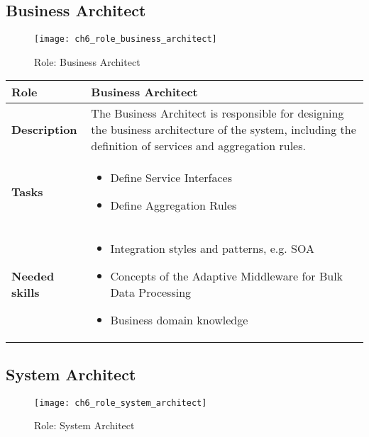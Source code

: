 \subsection{Business Architect}

\begin{figure}[htpb] \centering 
	\texttt{[image: ch6\_role\_business\_architect]} 
	\caption{Role: Business Architect} 
	\label{fig:ch6_role_business_architect} 
\end{figure}

\begin{tabularx}{\textwidth}{@{} l X @{}}
	\caption{Business Architect} \label{table:ch6_Role_Business_Analysist}\\
	\toprule
	\bfseries Role & Business Architect\\
	\midrule
	\bfseries Description & The Business Architect is responsible for designing the business architecture of the system, including the definition of services and aggregation rules.\\
	\midrule
	\bfseries Tasks & 
	\begin{itemize}
		\item Define Service Interfaces
		\item Define Aggregation Rules
	\end{itemize}
	\\
	\midrule 
	\bfseries Needed skills &
	\begin{itemize}
		\item Integration styles and patterns, e.g. \ac{SOA}
		\item Concepts of the Adaptive Middleware for Bulk Data Processing
		\item Business domain knowledge
	\end{itemize}
	\\
	\bottomrule
\end{tabularx}

\subsection{System Architect} 

\begin{figure}[htpb] \centering 
	\texttt{[image: ch6\_role\_system\_architect]} 
	\caption{Role: System Architect} 
	\label{fig:ch6_role_system_architect} 
\end{figure}

\newpage

